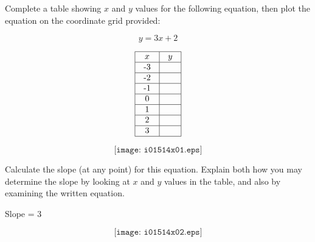 

Complete a table showing $x$ and $y$ values for the following equation, then plot the equation on the coordinate grid provided:

$$y = 3x + 2$$


$$\vbox{\offinterlineskip
\halign{\strut
\vrule \quad\hfil # \ \hfil & 
\vrule \quad\hfil # \ \hfil \vrule \cr
\noalign{\hrule}
%
$x$ & $y$ \cr
%
\noalign{\hrule}
%
-3 &  \cr
%
\noalign{\hrule}
%
-2 &  \cr
%
\noalign{\hrule}
%
-1 &  \cr
%
\noalign{\hrule}
%
0 &  \cr
%
\noalign{\hrule}
%
1 &  \cr
%
\noalign{\hrule}
%
2 &  \cr
%
\noalign{\hrule}
%
3 &  \cr
%
\noalign{\hrule}
} %
}$$ %

$$\texttt{[image: i01514x01.eps]}$$

Calculate the slope (at any point) for this equation.  Explain both how you may determine the slope by looking at $x$ and $y$ values in the table, and also by examining the written equation.







Slope = 3

$$\texttt{[image: i01514x02.eps]}$$











